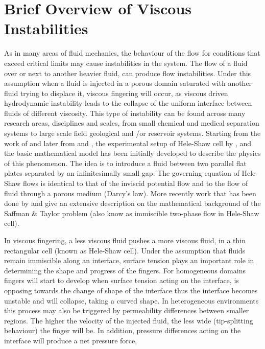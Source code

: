 \documentclass[preprint,authoryear,12pt]{elsarticle}
\begin{document}
\section{Brief Overview of Viscous Instabilities}\label{section:ViscousInstabilities}
\medskip
As in many areas of fluid mechanics, the behaviour of the flow for conditions that exceed critical limits may cause instabilities in the system. The flow of a fluid over or next to another heavier fluid, can produce flow instabilities. Under this assumption when a fluid is injected in a porous domain saturated with another fluid trying to displace it, viscous fingering will occur, as viscous driven hydrodynamic instability leads to the collapse of the uniform interface between fluids of different viscosity. This type of instability can be found across many research areas, disciplines and scales, from small chemical and medical separation systems to large scale field geological and /or reservoir systems. Starting from the work of \citet{muskat_1934} and later from \citet{saffman_1959} and \citet{homsy_1987}, the experimental setup of Hele-Shaw cell by \citet{saffman_1986}, and the basic mathematical model has been initially developed to describe the physics of this phenomenon. The idea is to introduce a fluid between two parallel flat plates separated by an infinitesimally small gap. The governing equation of Hele-Shaw flows is identical to that of the inviscid potential flow and to the flow of fluid through a porous medium (Darcy's law). More recently work that has been done by \citet{howison_2000} and \citet{praud_2005} give an extensive description on the mathematical background of the Saffman $\&$ Taylor problem (also know as immiscible two-phase flow in Hele-Shaw cell). 

\medskip
In viscous fingering, a less viscous fluid pushes a more viscous fluid, in a thin rectangular cell (known as Hele-Shaw cell). \citet{howison_2000}  Under the assumption that fluids remain immiscible along an interface, surface tension plays an important role in determining the shape and progress of the fingers. For homogeneous domains fingers will start to develop when surface tension acting on the interface, is opposing towards the change of shape of the interface thus the interface becomes unstable and will collapse, taking a curved shape. In heterogeneous environments this process may also be triggered by permeability differences between smaller regions. The higher the velocity of the injected fluid, the less wide (tip-splitting behaviour) the finger will be. In addition, pressure differences %
acting on the interface will produce a net pressure force,  
\end{document}
